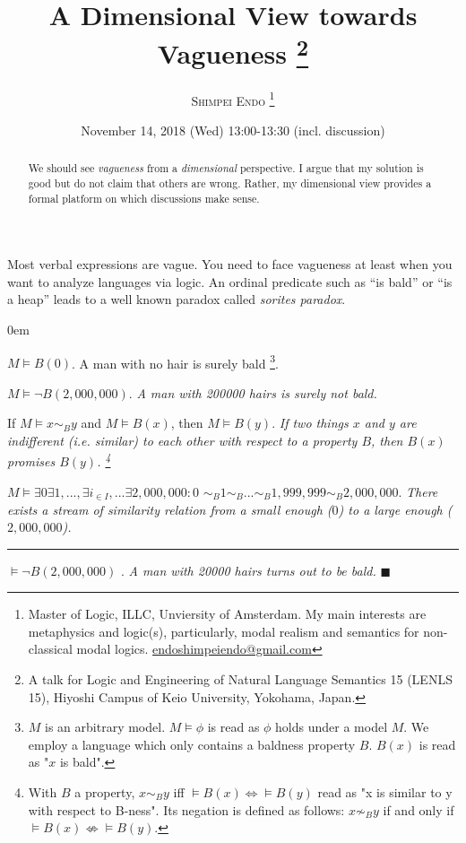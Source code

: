 \documentclass{tufte-handout}
\title{{\bf{A Dimensional View towards Vagueness} } %
\thanks{A talk for Logic and Engineering of Natural Language Semantics 15 (LENLS 15), Hiyoshi Campus of Keio University, Yokohama, Japan. }
}
\author{\textsc{Shimpei Endo
\thanks{Master of Logic, ILLC, Unviersity of Amsterdam.
My main interests are metaphysics and logic(s), particularly, modal realism and semantics for non-classical modal logics.
\Letter \url{endoshimpeiendo@gmail.com}
}
}
}
\date{November 14, 2018 (Wed) 13:00-13:30 (incl. discussion)} %
\begin{document}
\maketitle %

\begin{abstract}
We should see \emph{vagueness} from a \emph{dimensional} perspective.
I argue that my solution is good but do not claim that others are wrong.
Rather, my dimensional view provides a formal platform on which discussions make sense.
\end{abstract}

Most verbal expressions are vague.
You need to face vagueness at least when you want to analyze languages via logic. An ordinal predicate such as ``is bald'' or ``is a heap'' leads to a well known paradox called \emph{sorites paradox}.


\begin{description}
\itemsep0em
\item	[Obviously bald case:] $M \vDash B(0)$. A man with no hair is surely bald
\footnote{
$M$ is an arbitrary model. $M \vDash \phi$ is read as $\phi$ holds under a model $M$.
We employ a language which only contains a baldness property $B$. $B(x)$ is read as "$x$ is bald".
}.
\item	[Obviously non-bald case:] $M \vDash \neg B (2,000,000)$.
\emph{A man with 200000 hairs is surely \emph{not} bald.}

\item	[\emph{Tolerance Principle}:] If $M \vDash x \sim_{B} y$ and $M \vDash B(x)$, then $M \vDash B(y)$.
\emph{If two things $x$ and $y$ are indifferent (i.e. similar) to each other with respect to a property $B$, then $B(x)$ promises $B(y)$.
\footnote{
With $B$ a property,
$x \sim_{B} y$ iff $\vDash B(x) \Leftrightarrow \vDash B(y)$ read as "x is similar to y with respect to B-ness".
Its negation is defined as follows: $x \not \sim_{B} y$ if and only if  $\vDash B(x) \not \Leftrightarrow \vDash B(y)$.
}
}

\item	[Bridge:] $M \vDash \exists 0 \exists 1, ... , \exists i_{\in I}, ... \exists 2,000,000
:
0$
$\sim_{B} 1 \sim_{B} ... \sim_{B} 1,999,999 \sim_{B} 2,000,000$.
\emph{There exists a stream of similarity relation from a small enough ($0$) to a large enough ($2,000,000$).}

\noindent\rule{10cm}{0.4pt}

\item [Unwelcome conclusion] $\vDash \neg B (2,000,000)$  .
\emph{A man with 20000 hairs turns out to be bald.}
$\blacksquare$

\end{description}
\end{document}
